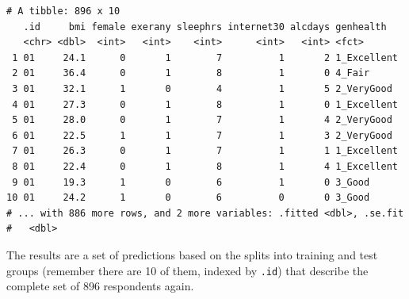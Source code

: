 \documentclass[]{book}
\newenvironment{Shaded}{\begin{snugshade}}{\end{snugshade}}
\newcommand{\KeywordTok}[1]{\textcolor[rgb]{0.13,0.29,0.53}{\textbf{#1}}}
\newcommand{\DataTypeTok}[1]{\textcolor[rgb]{0.13,0.29,0.53}{#1}}
\newcommand{\DecValTok}[1]{\textcolor[rgb]{0.00,0.00,0.81}{#1}}
\newcommand{\StringTok}[1]{\textcolor[rgb]{0.31,0.60,0.02}{#1}}
\newcommand{\OperatorTok}[1]{\textcolor[rgb]{0.81,0.36,0.00}{\textbf{#1}}}
\newcommand{\NormalTok}[1]{#1}
\theoremstyle{definition}
\theoremstyle{definition}
\theoremstyle{definition}
\theoremstyle{remark}
\begin{document}
\begin{Shaded}
\end{Shaded}

\begin{verbatim}
# A tibble: 896 x 10
   .id     bmi female exerany sleephrs internet30 alcdays genhealth  
   <chr> <dbl>  <int>   <int>    <int>      <int>   <int> <fct>      
 1 01     24.1      0       1        7          1       2 1_Excellent
 2 01     36.4      0       1        8          1       0 4_Fair     
 3 01     32.1      1       0        4          1       5 2_VeryGood 
 4 01     27.3      0       1        8          1       0 1_Excellent
 5 01     28.0      0       1        7          1       4 2_VeryGood 
 6 01     22.5      1       1        7          1       3 2_VeryGood 
 7 01     26.3      0       1        7          1       1 1_Excellent
 8 01     22.4      0       1        8          1       4 1_Excellent
 9 01     19.3      1       0        6          1       0 3_Good     
10 01     24.2      1       0        6          0       0 3_Good     
# ... with 886 more rows, and 2 more variables: .fitted <dbl>, .se.fit
#   <dbl>
\end{verbatim}

The results are a set of predictions based on the splits into training
and test groups (remember there are 10 of them, indexed by \texttt{.id})
that describe the complete set of 896 respondents again.
\end{document}
